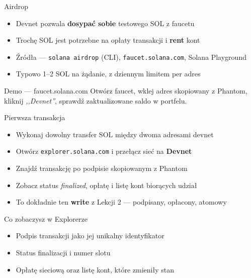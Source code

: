 \begin{frame}{Airdrop}
  \begin{itemize}
    \item Devnet pozwala \textbf{dosypać sobie} testowego SOL z faucetu
    \item Trochę SOL jest potrzebne na opłaty transakcji i \textbf{rent} kont
    \item Źródła --- \texttt{solana airdrop} (CLI), \texttt{faucet.solana.com}, Solana Playground
    \item Typowo 1--2 SOL na żądanie, z dziennym limitem per adres
  \end{itemize}
  \vspace{0.25cm}
  \begin{exampleblock}{Demo --- faucet.solana.com}
    Otwórz faucet, wklej adres skopiowany z Phantom, kliknij \textit{,,Devnet''},
    sprawdź zaktualizowane saldo w portfelu.
  \end{exampleblock}
\end{frame}

\begin{frame}{Pierwsza transakcja}
  \begin{itemize}
    \item Wykonaj dowolny transfer SOL między dwoma adresami devnet
    \item Otwórz \texttt{explorer.solana.com} i przełącz sieć na \textbf{Devnet}
    \item Znajdź transakcję po podpisie skopiowanym z Phantom
    \item Zobacz status \textit{finalized}, opłatę i listę kont biorących udział
    \item To dokładnie ten \textbf{write} z Lekcji 2 --- podpisany, opłacony, atomowy
  \end{itemize}
  \vspace{0.25cm}
  \begin{exampleblock}{Co zobaczysz w Explorerze}
    \begin{itemize}
      \item Podpis transakcji jako jej unikalny identyfikator
      \item Status finalizacji i numer slotu
      \item Opłatę sieciową oraz listę kont, które zmieniły stan
    \end{itemize}
  \end{exampleblock}
\end{frame}

